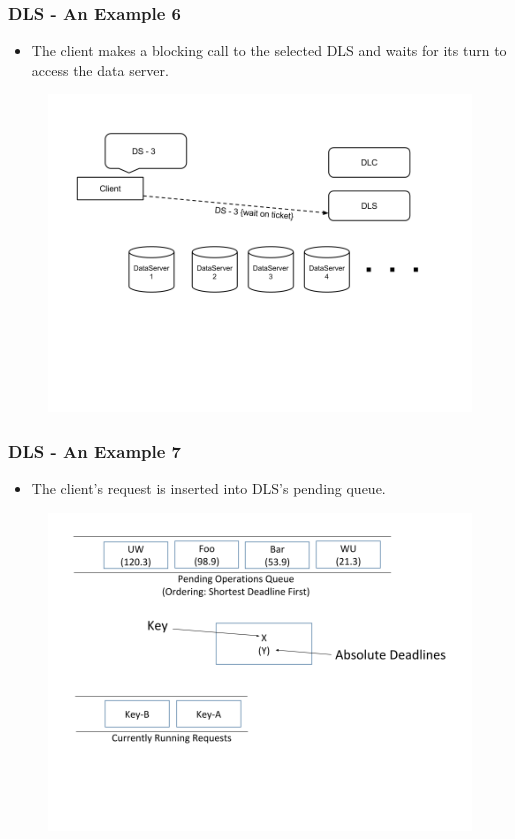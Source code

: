\documentclass{beamer}
\begin{document}
\begin{frame}
  \frametitle{DLS - An Example 6}
  \begin{itemize}
    \item The client makes a blocking call to the selected DLS and waits for
      its turn to access the data server.
  \end{itemize}
  \begin{figure}
    \begin{center}
      \centerline{\includegraphics[scale=0.40]{img/DLS_Example7.png}}
    \end{center}
  \end{figure}
\end{frame}

\begin{frame}
  \frametitle{DLS - An Example 7}
  \begin{itemize}
    \item The client's request is inserted into DLS's pending queue.
  \end{itemize}
  \begin{figure}
    \begin{center}
      \centerline{\includegraphics[scale=0.38]{img/DLS_Example8.png}}
    \end{center}
  \end{figure}
\end{frame}
\end{document}
